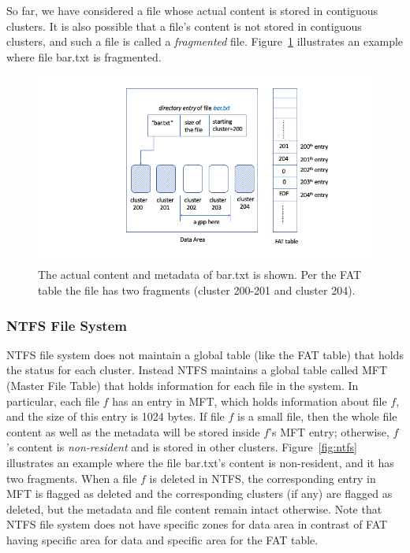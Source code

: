 So far, we have considered a file whose actual content is stored in contiguous clusters. 
It is also possible that a file's content is not stored in contiguous clusters, and such a file is 
called a \emph{fragmented} file. Figure~\ref{fig:fat3} illustrates an example where file bar.txt is fragmented.

 \begin{figure}[h]
     \centering
     \includegraphics[width=\linewidth]{fig/fat3.png}
     \caption{The actual content and metadata of bar.txt is shown. Per the FAT table the file has two fragments (cluster 200-201 and cluster 204).}
     \label{fig:fat3}
 \end{figure}



\subsubsection{NTFS File System} \label{subsubsec:ntfs-overview}

NTFS file system does not maintain a global table (like the FAT table) 
that holds the status for each cluster. Instead NTFS maintains a global table called 
MFT (Master File Table) that
holds information for each file in the system. In particular, each file $f$ has an 
entry in MFT, which holds information about file $f$, and the size of this entry is 1024 bytes.  
If file $f$ is a small file, then the whole file content as well as the metadata will be stored
inside $f$'s MFT entry; 
otherwise, $f$'s content is \emph{non-resident} and is stored in other clusters. 
Figure~\ref{fig:ntfs} illustrates an example where the file bar.txt's content is non-resident, 
and it has two fragments. When a file $f$ is deleted in NTFS, 
the corresponding entry in MFT is flagged as deleted and the corresponding clusters 
(if any) are flagged as deleted, but the metadata and file content remain intact otherwise.
Note that NTFS file system does not have specific zones for data area in contrast of 
FAT having specific area for data and specific area for the FAT table.


